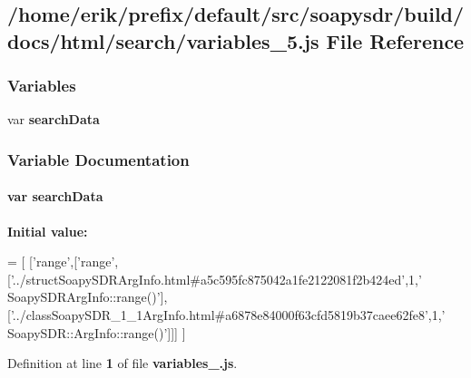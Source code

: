 \subsection{/home/erik/prefix/default/src/soapysdr/build/docs/html/search/variables\+\_\+5.js File Reference}
\label{variables__5_8js}
\subsubsection*{Variables}
\begin{DoxyCompactItemize}
\item 
var {\bf search\+Data}
\end{DoxyCompactItemize}


\subsubsection{Variable Documentation}
\paragraph[{search\+Data}]{\setlength{\rightskip}{0pt plus 5cm}var search\+Data}\label{variables__5_8js_ad01a7523f103d6242ef9b0451861231e}
{\bfseries Initial value\+:}
\begin{DoxyCode}
=
[
  [\textcolor{stringliteral}{'range'},[\textcolor{stringliteral}{'range'},[\textcolor{stringliteral}{'../structSoapySDRArgInfo.html#a5c595fc875042a1fe2122081f2b424ed'},1,\textcolor{stringliteral}{'
      SoapySDRArgInfo::range()'}],[\textcolor{stringliteral}{'../classSoapySDR\_1\_1ArgInfo.html#a6878e84000f63cfd5819b37caee62fe8'},1,\textcolor{stringliteral}{'
      SoapySDR::ArgInfo::range()'}]]]
]
\end{DoxyCode}


Definition at line {\bf 1} of file {\bf variables\+\_.\+js}.

